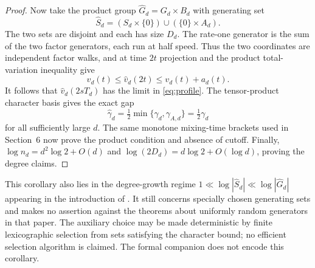 \begin{proof}
Now take the product group $\widehat G_d=G_d\times B_d$ with generating set
\[
 \widehat S_d=(S_d\times\{0\})\cup(\{0\}\times A_d).
\]
The two sets are disjoint and each has size $D_d$. The rate-one generator is the sum of the two factor generators, each run at half speed. Thus the two coordinates are independent factor walks, and at time $2t$ projection and the product total-variation inequality give
\[
 v_d(t)\le\widehat v_d(2t)\le v_d(t)+a_d(t).
\]
It follows that $\widehat v_d(2sT_d)$ has the limit in \eqref{eq:profile}. The tensor-product character basis gives the exact gap
\[
 \widehat\gamma_d=\tfrac12\min\{\gamma_d,\gamma_{A,d}\}
 =\tfrac12\gamma_d
\]
for all sufficiently large $d$. The same monotone mixing-time brackets used in Section~6 now prove the product condition and absence of cutoff. Finally,
$\log n_d=d^2\log2+O(d)$ and $\log(2D_d)=d\log2+O(\log d)$, proving the degree claims.
\end{proof}

This corollary also lies in the degree-growth regime $1\ll\log|\widehat S_d|\ll\log|\widehat G_d|$ appearing in the introduction of \cite{HOT}. It still concerns specially chosen generating sets and makes no assertion against the theorems about uniformly random generators in that paper. The auxiliary choice may be made deterministic by finite lexicographic selection from sets satisfying the character bound; no efficient selection algorithm is claimed. The formal companion does not encode this corollary.

